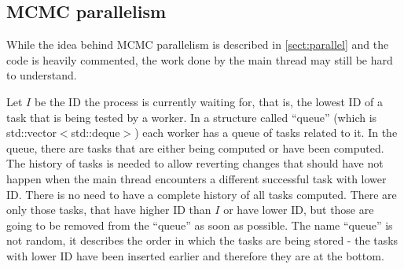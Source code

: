 \subsection{MCMC parallelism}
While the idea behind MCMC parallelism is described in \autoref{sect:parallel} and the code is heavily commented, the work done by the main thread may still be hard to understand.

Let $I$ be the ID the process is currently waiting for, that is, the lowest ID of a task that is being tested by a worker. In a structure called ``queue'' (which is std::vector$<$std::deque$>$) each worker has a queue of tasks related to it. In the queue, there are tasks that are either being computed or have been computed. The history of tasks is needed to allow reverting changes that should have not happen when the main thread encounters a different successful task with lower ID. There is no need to have a complete history of all tasks computed. There are only those tasks, that have higher ID than $I$ or have lower ID, but those are going to be removed from the ``queue'' as soon as possible. The name ``queue'' is not random, it describes the order in which the tasks are being stored - the tasks with lower ID have been inserted earlier and therefore they are at the bottom.


